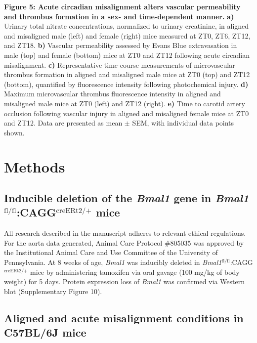 \documentclass[12pt]{article}
\begin{document}
\bigskip

\textbf{Figure 5: Acute circadian misalignment alters vascular permeability and thrombus formation
in a sex- and time-dependent manner.}
\textbf{a)} Urinary total nitrate concentrations, normalized to urinary creatinine, in aligned and
misaligned male (left) and female (right) mice measured at ZT0, ZT6, ZT12, and ZT18.
\textbf{b)} Vascular permeability assessed by Evans Blue extravasation in male (top) and female
(bottom) mice at ZT0 and ZT12 following acute circadian misalignment.
\textbf{c)} Representative time-course measurements of microvascular thrombus formation in aligned
and misaligned male mice at ZT0 (top) and ZT12 (bottom), quantified by fluorescence intensity
following photochemical injury.
\textbf{d)} Maximum microvascular thrombus fluorescence intensity in aligned and misaligned male
mice at ZT0 (left) and ZT12 (right).
\textbf{e)} Time to carotid artery occlusion following vascular injury in aligned and misaligned
female mice at ZT0 and ZT12. Data are presented as mean $\pm$ SEM, with individual data points
shown.

\section*{Methods}

\subsection*{Inducible deletion of the \textit{Bmal1} gene in \textit{Bmal1}$^{\text{fl/fl}}$:CAGG$^{\text{creERt2/+}}$ mice}

All research described in the manuscript adheres to relevant ethical regulations. For the aorta data generated, Animal Care Protocol \#805035 was approved by the Institutional Animal Care and Use Committee of the University of Pennsylvania. At 8 weeks of age, \textit{Bmal1} was inducibly deleted in
\textit{Bmal1}$^{\text{fl/fl}}$:CAGG$^{\text{creERt2/+}}$ mice by administering tamoxifen via oral
gavage (100 mg/kg of body weight) for 5 days. Protein expression loss of \textit{Bmal1} was confirmed via Western blot (Supplementary Figure 10).

\subsection*{Aligned and acute misalignment conditions in C57BL/6J mice}
\end{document}

